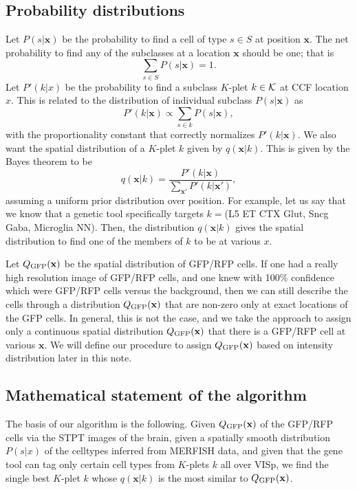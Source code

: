 \documentclass{article}
\newcommand\beq{\begin{equation}}
\newcommand\eeq[1]{\label{#1}\end{equation}}
\begin{document}
\subsection{Probability distributions}

Let $P(s|\mathbf{x})$ be the probability to find a cell of type $s\in S$
at position $\mathbf{x}$. 
The net probability to find any of the subclasses at a location $\mathbf{x}$ should be one; that is
\beq
\sum_{s\in S} P(s|\mathbf{x}) = 1.
\eeq{norms}
Let $P'(k|x)$ be the
probability to find a subclass $K$-plet $k \in {\cal K}$ at CCF location $x$.  This is
related to the distribution of individual subclass $P(s|\mathbf{x})$ as
\beq
P'(k|\mathbf{x}) \propto \sum_{s\in k} P(s|\mathbf{x}),
\eeq{kdist}
with the proportionality constant that correctly normalizes $P'(k|\mathbf{x})$. We also want
the spatial distribution of a $K$-plet $k$ given by $q(\mathbf{x}|k)$. This is given by the Bayes theorem to be 
\beq
q(\mathbf{x}|k) = \frac{P'(k|\mathbf{x})}{\sum_{\mathbf{x}'} P'(k|\mathbf{x}') },
\eeq{bayes}
assuming a uniform prior distribution over position. For example, let us say that we know that a 
genetic tool specifically targets $k=$(L5 ET CTX Glut, Sncg Gaba, Microglia NN).  Then, the 
distribution $q(\mathbf{x}|k)$ gives the spatial distribution to find one of the members of $k$ 
to be at various $x$.

Let $Q_{\rm GFP}(\mathbf{x})$ be the spatial distribution of GFP/RFP cells. If one had a really high resolution
image of GFP/RFP cells, and one knew with 100\% confidence which were GFP/RFP cells versus the background, 
then we can still describe the cells through a distribution $Q_{\rm GFP}(\mathbf{x})$ that are non-zero only 
at exact locations of the GFP cells. In general, this is not the case, and we take the approach to assign 
only a continuous spatial distribution $Q_{\rm GFP}(\mathbf{x})$ that there is a GFP/RFP cell at various $\mathbf{x}$.
We will define our procedure to assign $Q_{\rm GFP}(\mathbf{x})$ based on intensity distribution later in this note.

\subsection{Mathematical statement of the algorithm}
The basis of our algorithm is the following.  Given $Q_{\rm GFP}(\mathbf{x})$ of the GFP/RFP cells via the STPT images 
of the brain, given a spatially smooth distribution $P(s|x)$ of the celltypes inferred from MERFISH data, and 
given that the gene tool can tag only certain cell types from $K$-plets $k$ all over VISp, we find the single best $K$-plet $k$ 
whose $q(\mathbf{x}|k)$ is the most similar to $Q_{\rm GFP}(\mathbf{x})$.
\end{document}
